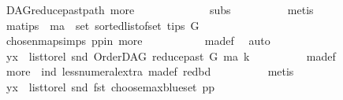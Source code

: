 \begin{isabellebody}
\ DAG{\isachardot}{\kern0pt}reduce{\isacharunderscore}{\kern0pt}past{\isacharunderscore}{\kern0pt}path{}\ more\ \ \isanewline
\ \ \ \ \ \ \ \ \ \ {}\ subs\isanewline
\ \ \ \ \ \ \ \ \isamarkupfalse%
\ {\isacharparenleft}{\kern0pt}metis{\isacharparenright}{\kern0pt}\ \isanewline
\ \ \ \ \ \ \isamarkupfalse%
\ \isamarkupfalse%
\ ma{\isacharunderscore}{\kern0pt}tips{\isacharcolon}{\kern0pt}\ {\isachardoublequoteopen}\ ma\ {\isasymin}\ set\ {\isacharparenleft}{\kern0pt}sorted{\isacharunderscore}{\kern0pt}list{\isacharunderscore}{\kern0pt}of{\isacharunderscore}{\kern0pt}set\ {\isacharparenleft}{\kern0pt}tips\ G{\isacharparenright}{\kern0pt}{\isacharparenright}{\kern0pt}{\isachardoublequoteclose}\ \isanewline
\ \ \ \ \ \ \ \ \isamarkupfalse%
\ chosen{\isacharunderscore}{\kern0pt}map{\isacharunderscore}{\kern0pt}simps{\isacharparenleft}{\kern0pt}{}{\isacharparenright}{\kern0pt}\ pp{\isacharunderscore}{\kern0pt}in\ more{\isacharparenleft}{\kern0pt}{}{\isacharparenright}{\kern0pt}\ \isanewline
\ \ \ \ \ \ \ \ \isamarkupfalse%
\ ma{\isacharunderscore}{\kern0pt}def\ \isamarkupfalse%
\ auto\isanewline
\ \ \ \ \ \ \isamarkupfalse%
\ \isamarkupfalse%
\ {\isachardoublequoteopen}{\isacharparenleft}{\kern0pt}y{\isacharcomma}{\kern0pt}x{\isacharparenright}{\kern0pt}\ {\isasymin}\ list{\isacharunderscore}{\kern0pt}to{\isacharunderscore}{\kern0pt}rel\ {\isacharparenleft}{\kern0pt}snd\ {\isacharparenleft}{\kern0pt}OrderDAG\ {\isacharparenleft}{\kern0pt}reduce{\isacharunderscore}{\kern0pt}past\ G\ ma{\isacharparenright}{\kern0pt}\ k{\isacharparenright}{\kern0pt}{\isacharparenright}{\kern0pt}{\isachardoublequoteclose}\isanewline
\ \ \ \ \ \ \ \ \isamarkupfalse%
\ ma{\isacharunderscore}{\kern0pt}def\isanewline
\ \ \ \ \ \ \ \ \isamarkupfalse%
\ more\ {}\ ind\ less{\isacharunderscore}{\kern0pt}numeral{\isacharunderscore}{\kern0pt}extra{\isacharparenleft}{\kern0pt}{}{\isacharparenright}{\kern0pt}\ ma{\isacharunderscore}{\kern0pt}def\ red{\isacharunderscore}{\kern0pt}bd\isanewline
\ \ \ \ \ \ \ \ \isamarkupfalse%
\ {\isacharparenleft}{\kern0pt}metis{\isacharparenright}{\kern0pt}\isanewline
\ \ \ \ \ \ \isamarkupfalse%
\ \isamarkupfalse%
\ {\isachardoublequoteopen}{\isacharparenleft}{\kern0pt}y{\isacharcomma}{\kern0pt}x{\isacharparenright}{\kern0pt}\ {\isasymin}\ list{\isacharunderscore}{\kern0pt}to{\isacharunderscore}{\kern0pt}rel\ {\isacharparenleft}{\kern0pt}snd\ {\isacharparenleft}{\kern0pt}fst\ {\isacharparenleft}{\kern0pt}choose{\isacharunderscore}{\kern0pt}max{\isacharunderscore}{\kern0pt}blue{\isacharunderscore}{\kern0pt}set\ pp{\isacharparenright}{\kern0pt}{\isacharparenright}{\kern0pt}{\isacharparenright}{\kern0pt}{\isachardoublequoteclose}\isanewline

\end{isabellebody}
